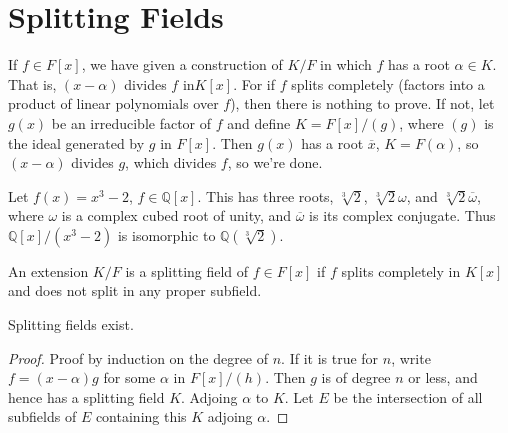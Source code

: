 \section{Splitting Fields}
    If $f\in{F}[x]$, we have given a construction of $K/F$ in which $f$ has
    a root $\alpha\in{K}$. That is, $(x-\alpha)$ divides $f$ in$ K[x]$. For
    if $f$ splits completely (factors into a product of linear polynomials
    over $f$), then there is nothing to prove. If not, let $g(x)$ be an
    irreducible factor of $f$ and define $K=F[x]/(g)$, where $(g)$ is the
    ideal generated by $g$ in $F[x]$. Then $g(x)$ has a root $\overline{x}$,
    $K=F(\alpha)$, so $(x-\alpha)$ divides $g$, which divides $f$, so we're
    done.
    \begin{example}
        Let $f(x)=x^{3}-2$, $f\in\mathbb{Q}[x]$. This has three roots,
        $\sqrt[3]{2}$, $\sqrt[3]{2}\omega$, and
        $\sqrt[3]{2}\overline{\omega}$, where $\omega$ is a complex cubed
        root of unity, and $\overline{\omega}$ is its complex conjugate.
        Thus $\mathbb{Q}[x]/(x^{3}-2)$ is isomorphic to
        $\mathbb{Q}(\sqrt[3]{2})$.
    \end{example}
    \begin{definition}
        An extension $K/F$ is a splitting field of $f\in{F}[x]$ if
        $f$ splits completely in $K[x]$ and does not split in any proper
        subfield.
    \end{definition}
    \begin{theorem}
        Splitting fields exist.
    \end{theorem}
    \begin{proof}
        Proof by induction on the degree of $n$. If it is true for $n$,
        write $f=(x-\alpha)g$ for some $\alpha$ in $F[x]/(h)$. Then
        $g$ is of degree $n$ or less, and hence has a splitting field
        $K$. Adjoing $\alpha$ to $K$. Let $E$ be the intersection of all
        subfields of $E$ containing this $K$ adjoing $\alpha$.
    \end{proof}
